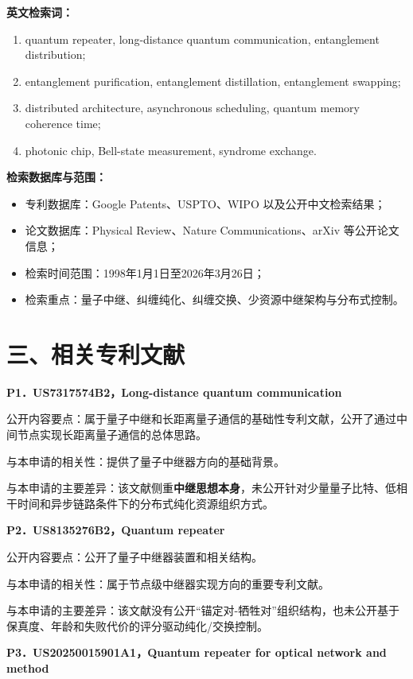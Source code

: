 \documentclass[12pt,a4paper]{article}
\begin{document}
\textbf{英文检索词：}
\begin{enumerate}[label=(\arabic*)]
    \item quantum repeater, long-distance quantum communication, entanglement distribution;
    \item entanglement purification, entanglement distillation, entanglement swapping;
    \item distributed architecture, asynchronous scheduling, quantum memory coherence time;
    \item photonic chip, Bell-state measurement, syndrome exchange.
\end{enumerate}

\textbf{检索数据库与范围：}
\begin{itemize}[leftmargin=2em]
    \item 专利数据库：Google Patents、USPTO、WIPO 以及公开中文检索结果；
    \item 论文数据库：Physical Review、Nature Communications、arXiv 等公开论文信息；
    \item 检索时间范围：1998年1月1日至2026年3月26日；
    \item 检索重点：量子中继、纠缠纯化、纠缠交换、少资源中继架构与分布式控制。
\end{itemize}

\section*{三、相关专利文献}

\textbf{P1．US7317574B2，Long-distance quantum communication}

公开内容要点：属于量子中继和长距离量子通信的基础性专利文献，公开了通过中间节点实现长距离量子通信的总体思路。

与本申请的相关性：提供了量子中继器方向的基础背景。

与本申请的主要差异：该文献侧重\textbf{中继思想本身}，未公开针对少量量子比特、低相干时间和异步链路条件下的分布式纯化资源组织方式。

\vspace{0.5em}
\textbf{P2．US8135276B2，Quantum repeater}

公开内容要点：公开了量子中继器装置和相关结构。

与本申请的相关性：属于节点级中继器实现方向的重要专利文献。

与本申请的主要差异：该文献没有公开“锚定对-牺牲对”组织结构，也未公开基于保真度、年龄和失败代价的评分驱动纯化/交换控制。

\vspace{0.5em}
\textbf{P3．US20250015901A1，Quantum repeater for optical network and method}
\end{document}
